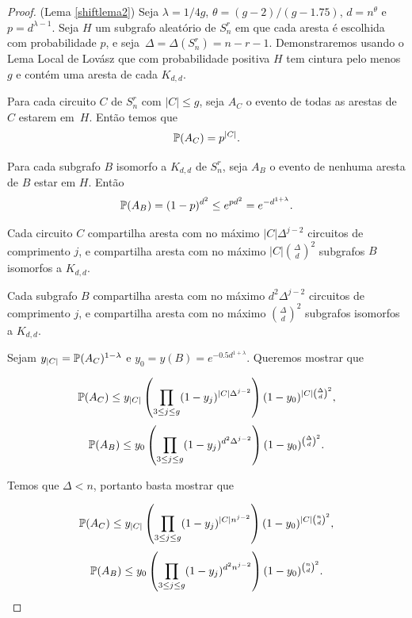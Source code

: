 \begin{proof}(Lema \ref{shiftlema2})
Seja $\lambda = 1/4g$, $\theta = (g-2)/(g-1.75)$, $d = n^\theta$ e $p = d^{\lambda-1}$. Seja $H$ um subgrafo aleatório de $S_n^r$ em que cada aresta é escolhida com probabilidade $p$, e seja~$\Delta = \Delta(S_n^r) = n-r-1$.
Demonstraremos usando o Lema Local de Lovász que com probabilidade positiva $H$ tem cintura pelo menos $g$ e contém uma aresta de cada $K_{d,d}$.

Para cada circuito $C$ de $S_n^r$ com $|C| \leq g$, seja $A_C$ o evento de todas as arestas de $C$ estarem em~$H$. Então temos que \[\mathbb{P}(A_C) = p^{|C|}.\]

Para cada subgrafo $B$ isomorfo a $K_{d,d}$ de $S_n^r$, seja $A_B$ o evento de nenhuma aresta de $B$ estar em $H$. Então \[\mathbb{P}(A_B) = (1-p)^{d^2} \leq e^{pd^2} = e^{-d^{1+\lambda}}.\]

Cada circuito $C$ compartilha aresta com no máximo $|C|\Delta^{j-2}$ circuitos de comprimento $j$, e compartilha aresta com no máximo $|C|\binom{\Delta}{d}^2$ subgrafos $B$ isomorfos a $K_{d,d}$.

Cada subgrafo $B$ compartilha aresta com no máximo $d^2\Delta^{j-2}$ circuitos de comprimento $j$, e compartilha aresta com no máximo $\binom{\Delta}{d}^2$ subgrafos isomorfos a $K_{d,d}$.

Sejam $y_{|C|} = \mathbb{P}(A_C)^{1-\lambda}$ e $y_0 = y(B) = e^{-0.5d^{1+\lambda}}$. Queremos mostrar que

\begin{equation*}
\mathbb{P}(A_C) \leq y_{|C|}\left(\prod_{3\leq j\leq g}(1-y_j)^{|C|\Delta^{j-2}}\right)(1-y_0)^{|C|\binom{\Delta}{d}^2},
\end{equation*}
\begin{equation*}
\mathbb{P}(A_B)\leq y_0 \left(\prod_{3\leq j\leq g}(1-y_j)^{d^2\Delta^{j-2}}\right)(1-y_0)^{\binom{\Delta}{d}^2}.
\end{equation*}

Temos que $\Delta < n$, portanto basta mostrar que

\begin{equation}\label{shiftllleq1}
\mathbb{P}(A_C) \leq y_{|C|}\left(\prod_{3\leq j\leq g}(1-y_j)^{|C|n^{j-2}}\right)(1-y_0)^{|C|\binom{n}{d}^2},
\end{equation}
\begin{equation}\label{shiftllleq2}
\mathbb{P}(A_B)\leq y_0 \left(\prod_{3\leq j\leq g}(1-y_j)^{d^2n^{j-2}}\right)(1-y_0)^{\binom{n}{d}^2}.
\end{equation}


\end{proof}
